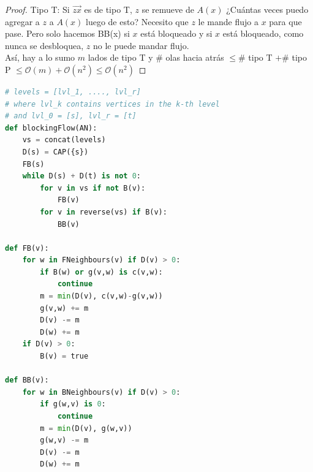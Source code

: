 \begin{proof}
Tipo T:
Si $\overrightarrow{zx}$ es de tipo T, $z$ se remueve de $A(x)$
¿Cuántas veces puedo agregar a $z$ a $A(x)$ luego de esto?
Necesito que $z$ le mande flujo a $x$ para que pase.
Pero solo hacemos BB(x) si $x$ está bloqueado y si $x$ está bloqueado, como nunca se desbloquea, $z$ no le puede mandar flujo.\\
Así, hay a lo sumo $m$ lados de tipo T y $\#$ olas hacia atrás $\le \#$ tipo T $+ \#$ tipo P
$\le \mathcal{O}(m) + \mathcal{O}(n^2)
\le \mathcal{O}(n^2)$
\end{proof}

\begin{lstlisting}[language=Python]
# levels = [lvl_1, ...., lvl_r]
# where lvl_k contains vertices in the k-th level
# and lvl_0 = [s], lvl_r = [t]
def blockingFlow(AN):
    vs = concat(levels)
    D(s) = CAP({s})
    FB(s)
    while D(s) + D(t) is not 0:
        for v in vs if not B(v):
            FB(v)
        for v in reverse(vs) if B(v):
            BB(v)

def FB(v):
    for w in FNeighbours(v) if D(v) > 0:
        if B(w) or g(v,w) is c(v,w):
            continue
        m = min(D(v), c(v,w)-g(v,w))
        g(v,w) += m
        D(v) -= m
        D(w) += m
    if D(v) > 0:
        B(v) = true
        
def BB(v):
    for w in BNeighbours(v) if D(v) > 0:
        if g(w,v) is 0:
            continue
        m = min(D(v), g(w,v))
        g(w,v) -= m
        D(v) -= m
        D(w) += m
\end{lstlisting}
